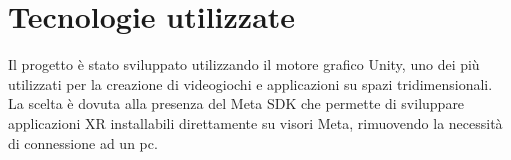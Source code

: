 \section{Tecnologie utilizzate}
\label{sec:introduzione_tecnologie_utilizzate}

Il progetto è stato sviluppato utilizzando il motore grafico Unity, uno dei più utilizzati
per la creazione di videogiochi e applicazioni su spazi tridimensionali. La
scelta è dovuta alla presenza del Meta SDK che permette di sviluppare
applicazioni XR installabili direttamente su visori Meta, rimuovendo la necessità
di connessione ad un pc.